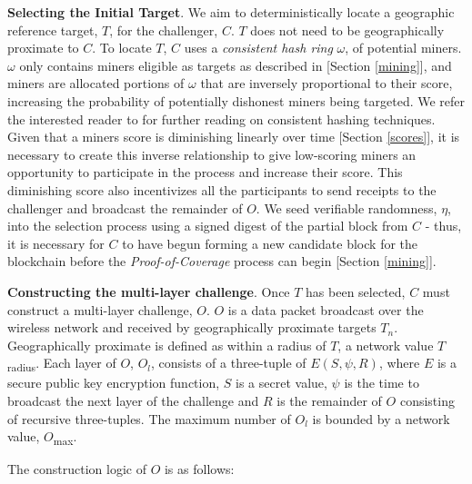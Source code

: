\documentclass[10pt, nonatbib, nocopyrightspace, reprint]{sigplanconf}
\begin{document}
\textbf{Selecting the Initial Target}. We aim to deterministically locate a geographic reference target, $T$, for the challenger, $C$. $T$ does not need to be geographically proximate to $C$. To locate $T$, $C$ uses a \emph{consistent hash ring} $\omega$, of potential miners. $\omega$ only contains miners eligible as targets as described in [Section \ref{mining}], and miners are allocated portions of $\omega$ that are inversely proportional to their score, increasing the probability of potentially dishonest miners being targeted. We refer the interested reader to \cite{hashing} for further reading on consistent hashing techniques. Given that a miners score is diminishing linearly over time [Section \ref{scores}], it is necessary to create this inverse relationship to give low-scoring miners an opportunity to participate in the process and increase their score. This diminishing score also incentivizes all the participants to send receipts to the challenger and broadcast the remainder of $O$. We seed verifiable randomness, $\eta$, into the selection process using a signed digest of the partial block from $C$ - thus, it is necessary for $C$ to have begun forming a new candidate block for the blockchain before the \emph{Proof-of-Coverage} process can begin [Section \ref{mining}].

\textbf{Constructing the multi-layer challenge}. Once $T$ has been selected, $C$ must construct a multi-layer challenge, $O$. $O$ is a data packet broadcast over the wireless network and received by geographically proximate targets $T_n$. Geographically proximate is defined as within a radius of $T$, a network value $T$\textsubscript{radius}. Each layer of $O$, $O_l$, consists of a three-tuple of $E\left(S, \psi, R\right)$, where $E$ is a secure public key encryption function, $S$ is a secret value, $\psi$ is the time to broadcast the next layer of the challenge and $R$ is the remainder of $O$ consisting of recursive three-tuples. The maximum number of $O_l$ is bounded by a network value, $O$\textsubscript{max}.

The construction logic of $O$ is as follows:
\end{document}
